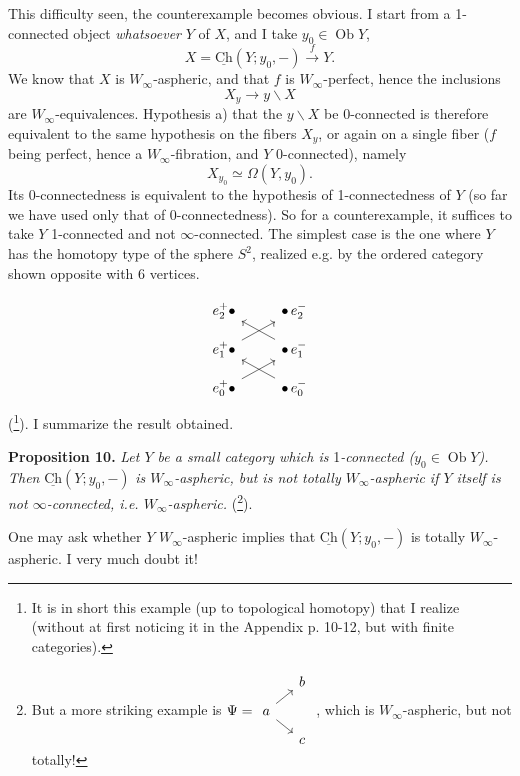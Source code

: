 \documentclass[11pt]{article}
\newcommand{\printedpage}[1]{\marginpar{\footnotesize p.~#1}}
\newcommand{\msp}[1]{\marginpar{\footnotesize [#1]}}
\newcommand{\uCh}{\underline{\mathrm{Ch}}}
\newcommand{\Ob}{\operatorname{Ob}}
\begin{document}
This difficulty seen, the counterexample becomes obvious. I start from a 1-connected object \textit{whatsoever} $Y$ of $X$, and I take $y_0 \in \Ob Y$,
\[
X = \uCh(Y; y_0, -) \xrightarrow{\ f\ } Y.
\]
We know that $X$ is $W_\infty$-aspheric, and that $f$ is $W_\infty$-perfect, hence the inclusions
\[
X_y \longrightarrow y\backslash X
\]
are $W_\infty$-equivalences. Hypothesis a) that the $y\backslash X$ be 0-connected is therefore equivalent to the same hypothesis on the fibers $X_y$, or
\msp{page 103}
again on a single fiber ($f$ being perfect, hence a $W_\infty$-fibration, and $Y$ 0-connected), namely
\[
X_{y_0} \simeq \Omega(Y, y_0).
\]
Its 0-connectedness is equivalent to the hypothesis of 1-connectedness of $Y$ (so far we have used only that of 0-connectedness). So for a counterexample, it suffices to take $Y$ 1-connected and not $\infty$-connected. The simplest case is the one where $Y$ has the homotopy type of the sphere $S^2$, realized e.g. by the ordered category shown opposite with 6 vertices.

\printedpage{72}
\[
\begin{tikzcd}[row sep=small]
e_2^+ \bullet & \bullet\, e_2^- \\
e_1^+ \bullet \arrow[ur] & \bullet\, e_1^- \arrow[ul] \\
e_0^+ \bullet \arrow[ur] & \bullet\, e_0^- \arrow[ul]
\end{tikzcd}
\]
 (\footnote{It is in short this example (up to topological homotopy) that I realize (without at first noticing it in the Appendix p. 10-12, but with finite categories).}). I summarize the result obtained.

\textbf{Proposition 10.} \textit{Let $Y$ be a small category which is} 1\textit{-connected ($y_0 \in \Ob Y$). Then} $\uCh(Y; y_0, -)$ \textit{is $W_\infty$-aspheric, but is not totally $W_\infty$-aspheric if $Y$ itself is not $\infty$-connected, i.e. $W_\infty$-aspheric.} (\footnote{But a more striking example is $\Psi = \begin{tikzcd}[ampersand replacement=\&, row sep=small, column sep=small, baseline=(A.base)]
 \& b \\
|[alias=A]| a \arrow[ur] \arrow[dr] \& \\
 \& c
\end{tikzcd}$ , which is $W_\infty$-aspheric, but not totally!}).

One may ask whether $Y$ $W_\infty$-aspheric implies that $\uCh(Y; y_0, -)$ is totally $W_\infty$-aspheric. I very much doubt it!
\end{document}
